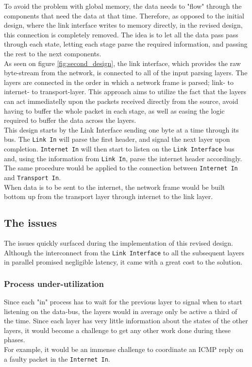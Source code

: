 To avoid the problem with global memory, the data needs to "flow" through the
components that need the data at that time. Therefore, as opposed to the initial
design, where the link interface writes to memory directly, in the revised design,
this connection is completely removed. The idea is to let all the data pass
pass through each state, letting each stage parse the required information, and
passing the rest to the next components.\\
As seen on figure \ref{fig:second_design}, the link interface, which
provides the raw byte-stream from the network, is connected to all of the input
parsing layers. The layers are connected in the order in which a network frame
is parsed; link- to internet- to transport-layer. This approach aims to utilize
the fact that the layers can act immediatelly upon the packets received directly
from the source, avoid having to buffer the whole packet in each stage, as well
as easing the logic required to buffer the data across the layers.\\
This design starts by the Link Interface sending one byte at a time through its bus.
The \texttt{Link In} will parse the first header, and signal the next layer upon completion.
\texttt{Internet In} will then start to listen on the \texttt{Link Interface} bus
and, using the information from \texttt{Link In}, parse the internet header
accordingly. The same procedure would be applied to the connection between
\texttt{Internet In} and \texttt{Transport In}.\\
When data is to be sent to the internet, the network frame would be built bottom
up from the transport layer through internet to the link layer.

\subsection{The issues}
The issues quickly surfaced during the implementation of this revised design. Although
the interconnect from the \texttt{Link Interface} to all the subsequent layers
in parallel promised negligible latency, it came with a great cost to the solution.

\subsubsection{Process under-utilization} \label{item:process_utilization}
Since each "in" process has to wait for the previous layer to signal when to
start listening on the data-bus, the layers would in average only be active a third
of the time. Since each layer has very little information about the states of
the other layers, it would become a challenge to get any other work done during
these phases.\\
For example, it would be an immense challenge to coordinate an ICMP reply on a
faulty packet in the \texttt{Internet In}.

